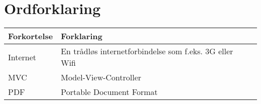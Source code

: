 \chapter*{Ordforklaring}

\begin{tabularx}{\textwidth}{l l X} \hline
	\textbf{Forkortelse}  & \textbf{Forklaring} \\ \hline
	Internet&  En trådløs internetforbindelse som f.eks. 3G eller Wifi& \\
	MVC& Model-View-Controller& \\
	PDF& Portable Document Format& \\ 
	
\end{tabularx}
